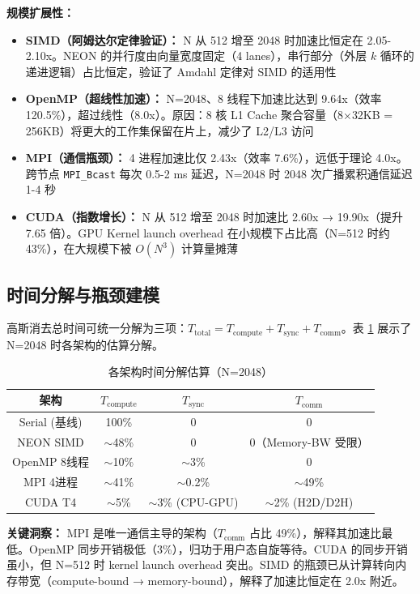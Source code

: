 \documentclass[a4paper]{article}
\begin{document}
\textbf{规模扩展性：}
\begin{itemize}
    \item \textbf{SIMD（阿姆达尔定律验证）：} N 从 512 增至 2048 时加速比恒定在 2.05-2.10x。NEON 的并行度由向量宽度固定（4 lanes），串行部分（外层 $k$ 循环的递进逻辑）占比恒定，验证了 Amdahl 定律对 SIMD 的适用性
    \item \textbf{OpenMP（超线性加速）：} N=2048、8 线程下加速比达到 9.64x（效率 120.5\%），超过线性（8.0x）。原因：8 核 L1 Cache 聚合容量（8$\times$32KB = 256KB）将更大的工作集保留在片上，减少了 L2/L3 访问
    \item \textbf{MPI（通信瓶颈）：} 4 进程加速比仅 2.43x（效率 7.6\%），远低于理论 4.0x。跨节点 \texttt{MPI\_Bcast} 每次 0.5-2 ms 延迟，N=2048 时 2048 次广播累积通信延迟 1-4 秒
    \item \textbf{CUDA（指数增长）：} N 从 512 增至 2048 时加速比 2.60x → 19.90x（提升 7.65 倍）。GPU Kernel launch overhead 在小规模下占比高（N=512 时约 43\%），在大规模下被 $O(N^3)$ 计算量摊薄
\end{itemize}

\subsection{时间分解与瓶颈建模}

高斯消去总时间可统一分解为三项：$T_{\text{total}} = T_{\text{compute}} + T_{\text{sync}} + T_{\text{comm}}$。表 \ref{table:decomp} 展示了 N=2048 时各架构的估算分解。

\begin{table}[H]
  \centering
  \caption{各架构时间分解估算（N=2048）}
  \label{table:decomp}
  \begin{tabular}{|c|c|c|c|}
  \hline
  \textbf{架构} & $T_{\text{compute}}$ & $T_{\text{sync}}$ & $T_{\text{comm}}$ \\
  \hline
  Serial (基线) & 100\% & 0 & 0 \\
  NEON SIMD & $\sim$48\% & 0 & 0（Memory-BW 受限） \\
  OpenMP 8线程 & $\sim$10\% & $\sim$3\% & 0 \\
  MPI 4进程 & $\sim$41\% & $\sim$0.2\% & $\sim$49\% \\
  CUDA T4 & $\sim$5\% & $\sim$3\% (CPU-GPU) & $\sim$2\% (H2D/D2H) \\
  \hline
  \end{tabular}
\end{table}

\textbf{关键洞察：} MPI 是唯一通信主导的架构（$T_{\text{comm}}$ 占比 49\%），解释其加速比最低。OpenMP 同步开销极低（3\%），归功于用户态自旋等待。CUDA 的同步开销虽小，但 N=512 时 kernel launch overhead 突出。SIMD 的瓶颈已从计算转向内存带宽（compute-bound → memory-bound），解释了加速比恒定在 2.0x 附近。
\end{document}
